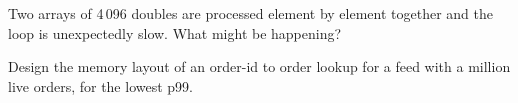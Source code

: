 \begin{interviewq}\label{iq:ll:memory-hierarchy-and-caches:5}
Two arrays of 4\,096 doubles are processed element by element together and the loop is unexpectedly slow. What might be
happening?
\end{interviewq}

\begin{interviewq}\label{iq:ll:memory-hierarchy-and-caches:6}
Design the memory layout of an order-id to order lookup for a feed with a million live orders, for the lowest p99.
\end{interviewq}
